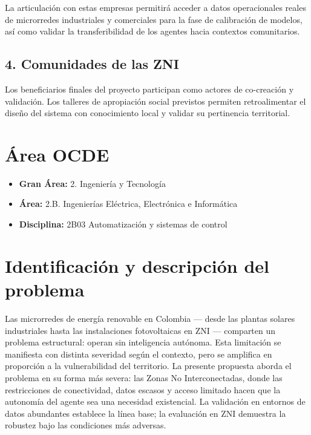 \documentclass[12pt,letterpaper]{article}
\begin{document}
La articulaci\'on con estas empresas permitir\'a acceder a datos operacionales reales de microrredes industriales y comerciales para la fase de calibraci\'on de modelos, as\'i como validar la transferibilidad de los agentes hacia contextos comunitarios.

\subsection*{4. Comunidades de las ZNI}

Los beneficiarios finales del proyecto participan como actores de co-creaci\'on y validaci\'on. Los talleres de apropiaci\'on social previstos permiten retroalimentar el dise\~no del sistema con conocimiento local y validar su pertinencia territorial.

\section{\'Area OCDE}

\begin{itemize}
\item \textbf{Gran \'Area:} 2. Ingenier\'ia y Tecnolog\'ia
\item \textbf{\'Area:} 2.B. Ingenier\'ias El\'ectrica, Electr\'onica e Inform\'atica
\item \textbf{Disciplina:} 2B03 Automatizaci\'on y sistemas de control
\end{itemize}

\section{Identificaci\'on y descripci\'on del problema}

Las microrredes de energ\'ia renovable en Colombia --- desde las plantas solares industriales hasta las instalaciones fotovoltaicas en ZNI --- comparten un problema estructural: operan sin inteligencia aut\'onoma. Esta limitaci\'on se manifiesta con distinta severidad seg\'un el contexto, pero se amplifica en proporci\'on a la vulnerabilidad del territorio. La presente propuesta aborda el problema en su forma m\'as severa: las Zonas No Interconectadas, donde las restricciones de conectividad, datos escasos y acceso limitado hacen que la autonom\'ia del agente sea una necesidad existencial. La validaci\'on en entornos de datos abundantes establece la l\'inea base; la evaluaci\'on en ZNI demuestra la robustez bajo las condiciones m\'as adversas.
\end{document}
